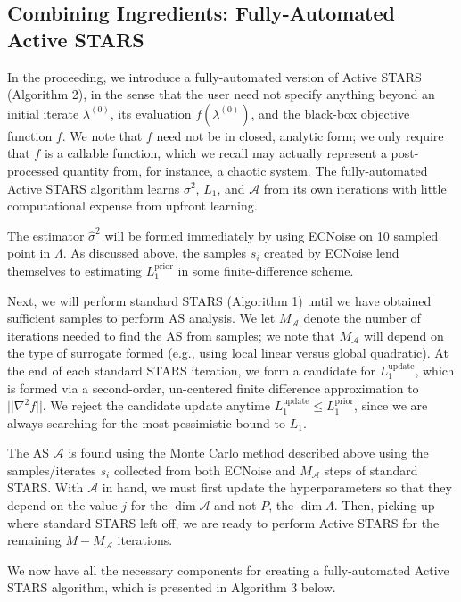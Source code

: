 \documentclass{amsart}
\newcommand{\A}{\mathcal{A}}
\begin{document}
\subsection{Combining Ingredients: Fully-Automated Active STARS} 
In the proceeding, we introduce a fully-automated version of Active STARS (Algorithm 2), in the sense that the user need not specify anything beyond an initial iterate $\lambda^{(0)}$, its evaluation $f(\lambda^{(0)})$, and the black-box objective function $f$. We note that $f$ need not be in closed, analytic form; we only require that $f$ is a callable function, which we recall may actually represent a post-processed quantity from, for instance, a chaotic system. The fully-automated Active STARS algorithm learns $\sigma^2$, $L_1$, and $\A$ from its own iterations with little computational expense from upfront learning.

The estimator $\hat{\sigma}^2$ will be formed immediately by using ECNoise on 10 sampled point in $\Lambda$. As discussed above, the samples $s_i$ created by ECNoise lend themselves to estimating $L_1^\text{prior}$ in some finite-difference scheme.

Next, we will perform standard STARS (Algorithm 1) until we have obtained sufficient samples to perform AS analysis. We let $M_\A$ denote the number of iterations needed to find the AS from samples; we note that $M_\A$ will depend on the type of surrogate formed (e.g., using local linear versus global quadratic). At the end of each standard STARS iteration, we form a candidate for $L_1^\text{update}$, which is formed via a second-order, un-centered finite difference approximation to $||\nabla^2 f||.$ We reject the candidate update anytime $L_1^\text{update} \leq L_1^\text{prior}$, since we are always searching for the most pessimistic bound to $L_1$.

The AS $\A$ is found using the Monte Carlo method described above using the samples/iterates $s_i$ collected from both ECNoise and $M_\A$ steps of standard STARS. With $\A$ in hand, we must first update the hyperparameters so that they depend on the value $j$ for the $\dim \A$ and not $P$, the $\dim \Lambda$. Then, picking up where standard STARS left off, we are ready to perform Active STARS for the remaining $M-M_\A$ iterations.

We now have all the necessary components for creating a fully-automated Active STARS algorithm, which is presented in Algorithm 3 below.

\vspace{.25cm}
\end{document}

